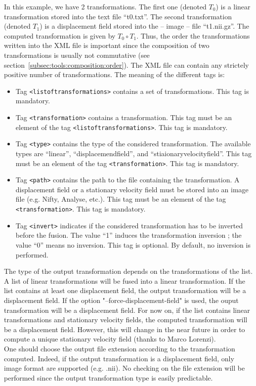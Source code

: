 In this example, we have 2 transformations. The first one (denoted $T_0$) is a linear transformation stored into the text file ``t0.txt''. The second transformation (denoted $T_1$) is a displacement field stored into the -- image -- file ``t1.nii.gz''. The computed transformation is given by $T_0 \circ T_1$. Thus, the order the transformations written into the XML file is important since the composition of two transformations is usually not commutative (see section~\ref{subsec:tools:composition:order}). The XML file can contain any strictely positive number of transformations. The meaning of the different tags is:
%
\begin{itemize}
%
\item Tag \texttt{<listoftransformations>} contains a set of transformations. This tag is mandatory.
%
\item Tag \texttt{<transformation>} contains a transformation. This tag must be an element of the tag \texttt{<listoftransformations>}. This tag is mandatory.
%
\item Tag \texttt{<type>} contains the type of the considered transformation. The available types are ``linear'', ``displacemendfield'', and ``stiaionaryvelocityfield''. This tag must be an element of the tag \texttt{<transformation>}. This tag is mandatory.
%   
\item Tag \texttt{<path>} contains the path to the file containing the transformation. A displacement field or a stationary velocity field must be stored into an image file (e.g. Nifty, Analyse, etc.). This tag must be an element of the tag \texttt{<transformation>}. This tag is mandatory.
%
\item Tag \texttt{<invert>} indicates if the considered transformation has to be inverted before the fusion. The value ``1'' induces the transformation inversion ; the value ``0'' means no inversion. This tag is optional. By default, no inversion is performed.
%
\end{itemize}
%
The type of the output transformation depends on the transformations of the list. A list of linear transformations will be fused into a linear transformation. If the list contains at least one displacement field, the output transformation will be a displacement field. If the option "--force-displacement-field" is used, the ouput transformation will be a displacement field.
For now on, if the list contains linear transformations and stationary velocity fields, the computed transformation will be a displacement field. However, this will change in the near future in order to compute a unique stationary velocity field (thanks to Marco Lorenzi).
\\
One should choose the output file extension according to the transformation computed. Indeed, if the output transformation is a displacement field, only image format are supported (e.g. .nii). No checking on the file extension will be performed since the output transformation type is easily predictable.


